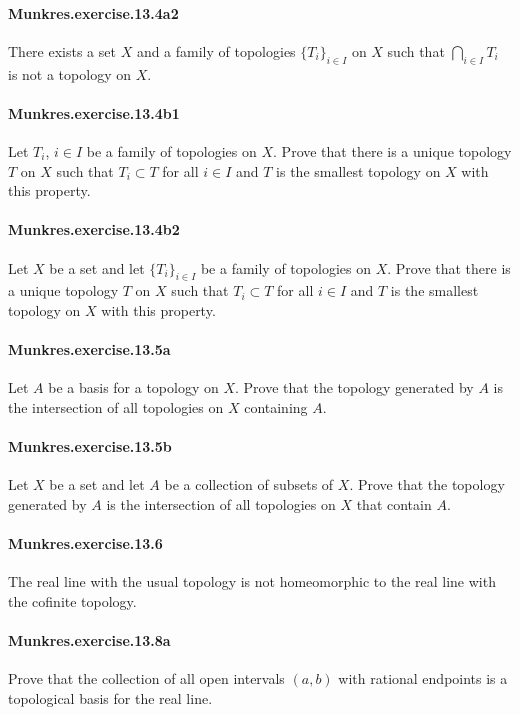 \documentclass{article}
\begin{document}
\paragraph{Munkres.exercise.13.4a2} There exists a set $X$ and a family of topologies $\{T_i\}_{i\in I}$ on $X$ such that $\bigcap_{i\in I} T_i$ is not a topology on $X$.

\paragraph{Munkres.exercise.13.4b1} Let $T_i$, $i\in I$ be a family of topologies on $X$. Prove that there is a unique topology $T$ on $X$ such that $T_i\subset T$ for all $i\in I$ and $T$ is the smallest topology on $X$ with this property.

\paragraph{Munkres.exercise.13.4b2} Let $X$ be a set and let $\{T_i\}_{i\in I}$ be a family of topologies on $X$. Prove that there is a unique topology $T$ on $X$ such that $T_i\subset T$ for all $i\in I$ and $T$ is the smallest topology on $X$ with this property.

\paragraph{Munkres.exercise.13.5a} Let $A$ be a basis for a topology on $X$. Prove that the topology generated by $A$ is the intersection of all topologies on $X$ containing $A$.

\paragraph{Munkres.exercise.13.5b} Let $X$ be a set and let $A$ be a collection of subsets of $X$. Prove that the topology generated by $A$ is the intersection of all topologies on $X$ that contain $A$.

\paragraph{Munkres.exercise.13.6} The real line with the usual topology is not homeomorphic to the real line with the cofinite topology.

\paragraph{Munkres.exercise.13.8a} Prove that the collection of all open intervals $(a,b)$ with rational endpoints is a topological basis for the real line.
\end{document}
